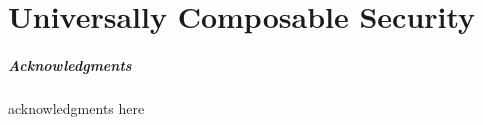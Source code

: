 \documentclass[runningheads,orivec]{llncs}
\date{\today}					%
\def\acknowledgmenttext{
	acknowledgments here
}
\begin{document}


\chapter{Universally Composable Security}




\checkfornotes
\ifnum{}
	\ifnum{}
		\paragraph{Acknowledgments}
		\acknowledgmenttext
	\fi
\fi
\ifnum{}
	
\else
	
\fi
\appendix




\end{document}
